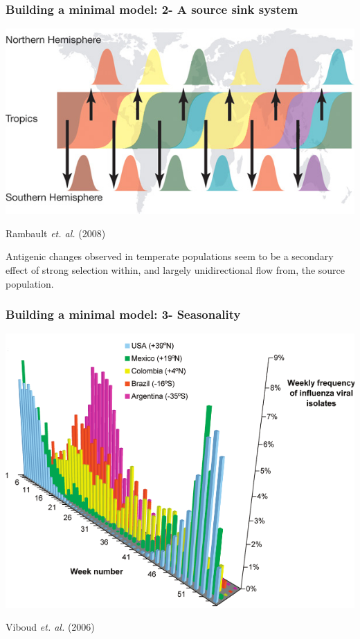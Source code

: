 \documentclass{beamer}
\begin{document}
\begin{frame}
  \frametitle{Building a minimal model: 2- A source sink system}
  \begin{center}
    \includegraphics[width=0.8 \linewidth]{graph/rambault.jpg}      

    \begin{tiny} Rambault \textit{et. al.} (2008) \end{tiny}
  \end{center}
\begin{block}{}
  Antigenic changes observed in temperate populations seem to be a
  secondary effect of strong selection within, and largely
  unidirectional flow from, the source population.
\end{block}
\end{frame}


\begin{frame}
  \frametitle{Building a minimal model: 3- Seasonality}
  \begin{center}
    \includegraphics[width=0.8 \linewidth]{graph/viboud.png}
    \begin{tiny} Viboud \textit{et. al.} (2006) \end{tiny}
  \end{center}
\end{frame}
\end{document}
